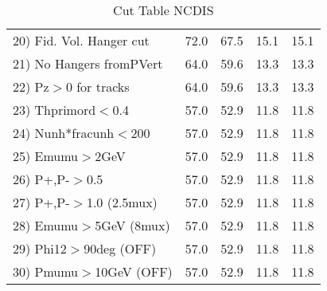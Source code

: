 \begin{table}[h!]
\begin{tabular}{||l||r|r|r|r||}
 20) Fid. Vol. Hanger cut &        72.0 &        67.5 &        15.1 &        15.1 \\
 21) No Hangers fromPVert &        64.0 &        59.6 &        13.3 &        13.3 \\
 22) Pz$>$0 for tracks    &        64.0 &        59.6 &        13.3 &        13.3 \\
 23) Thprimord$<$0.4      &        57.0 &        52.9 &        11.8 &        11.8 \\
 24) Nunh*fracunh$<$200   &        57.0 &        52.9 &        11.8 &        11.8 \\
 25) Emumu$>$2GeV         &        57.0 &        52.9 &        11.8 &        11.8 \\
 26) P+,P-$>$0.5          &        57.0 &        52.9 &        11.8 &        11.8 \\
 27) P+,P-$>$1.0 (2.5mux) &        57.0 &        52.9 &        11.8 &        11.8 \\
 28) Emumu$>$5GeV  (8mux) &        57.0 &        52.9 &        11.8 &        11.8 \\
 29) Phi12$>$90deg  (OFF) &        57.0 &        52.9 &        11.8 &        11.8 \\
 30) Pmumu$>$10GeV  (OFF) &        57.0 &        52.9 &        11.8 &        11.8 \\
 \hline
 \hline
 \end{tabular}
 \caption{Cut Table  NCDIS  }
 \label{tab-cut_ncdis}
 \end{table}
